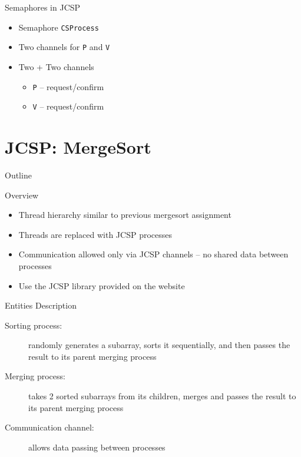 \begin{frame}{Semaphores in JCSP}
  \begin{itemize}
  \item Semaphore \lstinline!CSProcess!
  \item Two channels for \lstinline!P! and \lstinline!V!
  \item Two + Two channels
    \begin{itemize}
    \item \lstinline!P! -- request/confirm
    \item \lstinline!V! -- request/confirm
    \end{itemize}
  \end{itemize}
\end{frame}


\section{JCSP: MergeSort}

\begin{frame}{Outline}
  \tableofcontents[current]
\end{frame}

\begin{frame}{Overview}
  \begin{itemize}
  \item Thread hierarchy similar to previous mergesort assignment
  \item Threads are replaced with JCSP processes
  \item Communication allowed only via JCSP channels – no shared data
    between processes
  \item Use the JCSP library provided on the website
  \end{itemize}
\end{frame}

\begin{frame}{Entities Description}
  \begin{description}
  \item[Sorting process:] randomly generates a subarray, sorts it
    sequentially, and then passes the result to its parent merging
    process
  \item[Merging process:] takes 2 sorted subarrays from its children,
    merges and passes the result to its parent merging process
  \item[Communication channel:] allows data passing between processes
  \end{description}
\end{frame}

